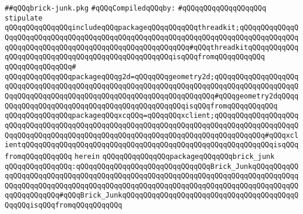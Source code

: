 \label{src/lib/x-kit/tut/badbricks-game/brick-junk.pkg}
\verb|##qQQqbrick-junk.pkg|\newline
\newline
\verb|#qQQqCompiledqQQqby:|\newline
\verb|#qQQqqQQqqQQqqQQqqQQq|\newline
\newline
\newline
\verb|stipulate|\newline
\verb|qQQqqQQqqQQqqQQqincludeqQQqpackageqQQqqQQqqQQqthreadkit;qQQqqQQqqQQqqQQqqQQqqQQqqQQqqQQqqQQqqQQqqQQqqQQqqQQqqQQqqQQqqQQqqQQqqQQqqQQqqQQqqQQqqQQqqQQqqQQqqQQqqQQqqQQqqQQqqQQqqQQqqQQqqQQq#qQQqthreadkitqQQqqQQqqQQqqQQqqQQqqQQqqQQqqQQqqQQqqQQqqQQqqQQqqQQqisqQQqfromqQQqqQQqqQQq|\newline
\verb|qQQqqQQqqQQqqQQq#|\newline
\verb|qQQqqQQqqQQqqQQqpackageqQQqg2d=qQQqqQQqgeometry2d;qQQqqQQqqQQqqQQqqQQqqQQqqQQqqQQqqQQqqQQqqQQqqQQqqQQqqQQqqQQqqQQqqQQqqQQqqQQqqQQqqQQqqQQqqQQqqQQqqQQqqQQqqQQqqQQqqQQqqQQqqQQqqQQqqQQqqQQqqQQq#qQQqgeometry2dqQQqqQQqqQQqqQQqqQQqqQQqqQQqqQQqqQQqqQQqqQQqqQQqisqQQqfromqQQqqQQqqQQq|\newline
\newline
\verb|qQQqqQQqqQQqqQQqpackageqQQqxcqQQq=qQQqqQQqxclient;qQQqqQQqqQQqqQQqqQQqqQQqqQQqqQQqqQQqqQQqqQQqqQQqqQQqqQQqqQQqqQQqqQQqqQQqqQQqqQQqqQQqqQQqqQQqqQQqqQQqqQQqqQQqqQQqqQQqqQQqqQQqqQQqqQQqqQQqqQQqqQQqqQQqqQQq#qQQqxclientqQQqqQQqqQQqqQQqqQQqqQQqqQQqqQQqqQQqqQQqqQQqqQQqqQQqqQQqqQQqisqQQqfromqQQqqQQqqQQq|\newline
\verb|herein|\newline
\newline
\verb|qQQqqQQqqQQqqQQqpackageqQQqqQQqbrick_junk|\newline
\verb|qQQqqQQqqQQqqQQq:qQQqqQQqqQQqqQQqqQQqqQQqqQQqqQQqBrick_JunkqQQqqQQqqQQqqQQqqQQqqQQqqQQqqQQqqQQqqQQqqQQqqQQqqQQqqQQqqQQqqQQqqQQqqQQqqQQqqQQqqQQqqQQqqQQqqQQqqQQqqQQqqQQqqQQqqQQqqQQqqQQqqQQqqQQqqQQqqQQqqQQqqQQqqQQqqQQqqQQqqQQq#qQQqBrick_JunkqQQqqQQqqQQqqQQqqQQqqQQqqQQqqQQqqQQqqQQqqQQqqQQqisqQQqfromqQQqqQQqqQQq|\newline
